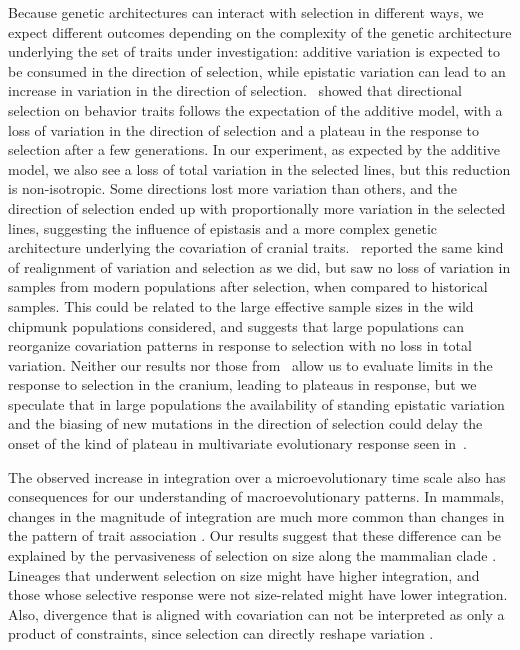 \begin{refsection}
Because genetic architectures can interact with selection in different
ways, we expect different outcomes depending on the complexity of the
genetic architecture underlying the set of traits under investigation:
additive variation is expected to be consumed in the direction of
selection, while epistatic variation can lead to an increase in
variation in the direction of selection.~\textcite{Careau2015-sy} showed that
directional selection on behavior traits follows the expectation of the
additive model, with a loss of variation in the direction of selection
and a plateau in the response to selection after a few generations. In
our experiment, as expected by the additive model, we also see a loss of
total variation in the selected lines, but this reduction is
non-isotropic. Some directions lost more variation than others, and the
direction of selection ended up with proportionally more variation in
the selected lines, suggesting the influence of epistasis and a more
complex genetic architecture underlying the covariation of cranial
traits.~\textcite{Assis2016-vz} reported the same kind of realignment of variation
and selection as we did, but saw no loss of variation in samples from
modern populations after selection, when compared to historical samples.
This could be related to the large effective sample sizes in the wild
chipmunk populations considered, and suggests that large populations can
reorganize covariation patterns in response to selection with no loss in
total variation. Neither our results nor those from~\textcite{Assis2016-vz} allow us
to evaluate limits in the response to selection in the cranium, leading
to plateaus in response, but we speculate that in large populations the
availability of standing epistatic variation and the biasing of new
mutations in the direction of selection could delay the onset of the
kind of plateau in multivariate evolutionary response seen
in~\textcite{Careau2015-sy}.

The observed increase in integration over a microevolutionary time scale
also has consequences for our understanding of macroevolutionary
patterns. In mammals, changes in the magnitude of integration are much
more common than changes in the pattern of trait association
\parencite{Porto2009-pi}. Our results suggest that these difference can be
explained by the pervasiveness of selection on size along the mammalian
clade \parencite{Marroig2005-ce, Baker2015-ti}. Lineages that underwent selection
on size might have higher integration, and those whose selective
response were not size-related might have lower integration. Also,
divergence that is aligned with covariation can not be interpreted as
only a product of constraints, since selection can directly reshape
variation \parencite{Punzalan2016-lb}.


\end{refsection}
